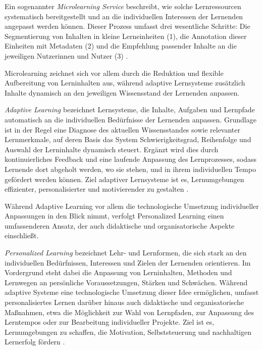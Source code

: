 Ein sogenannter \textit{Microlearning Service} beschreibt, wie solche Lernressourcen systematisch bereitgestellt und an die individuellen Interessen der Lernenden angepasst werden können. Dieser Prozess umfasst drei wesentliche Schritte: Die Segmentierung von Inhalten in kleine Lerneinheiten (1), die Annotation dieser Einheiten mit Metadaten (2) und die Empfehlung passender Inhalte an die jeweiligen Nutzerinnen und Nutzer (3) \parencite[S.~152--154]{lin_survey_2019}.

Microlearning zeichnet sich vor allem durch die Reduktion und flexible Aufbereitung von Lerninhalten aus, während adaptive Lernsysteme zusätzlich Inhalte dynamisch an den jeweiligen Wissensstand der Lernenden anpassen.

\textit{Adaptive Learning} bezeichnet Lernsysteme, die Inhalte, Aufgaben und Lernpfade automatisch an die individuellen Bedürfnisse der Lernenden anpassen. Grundlage ist in der Regel eine Diagnose des aktuellen Wissensstandes sowie relevanter Lernmerkmale, auf deren Basis das System Schwierigkeitsgrad, Reihenfolge und Auswahl der Lerninhalte dynamisch steuert. Ergänzt wird dies durch kontinuierliches Feedback und eine laufende Anpassung des Lernprozesses, sodass Lernende dort abgeholt werden, wo sie stehen, und in ihrem individuellen Tempo gefördert werden können. Ziel adaptiver Lernsysteme ist es, Lernumgebungen effizienter, personalisierter und motivierender zu gestalten \parencite[S.~448]{zhao_research_2019}.

Während Adaptive Learning vor allem die technologische Umsetzung individueller Anpassungen in den Blick nimmt, verfolgt Personalized Learning einen umfassenderen Ansatz, der auch didaktische und organisatorische Aspekte einschließt.

\textit{Personalized Learning} bezeichnet Lehr- und Lernformen, die sich stark an den individuellen Bedürfnissen, Interessen und Zielen der Lernenden orientieren. Im Vordergrund steht dabei die Anpassung von Lerninhalten, Methoden und Lernwegen an persönliche Voraussetzungen, Stärken und Schwächen. Während adaptive Systeme eine technologische Umsetzung dieser Idee ermöglichen, umfasst personalisiertes Lernen darüber hinaus auch didaktische und organisatorische Maßnahmen, etwa die Möglichkeit zur Wahl von Lernpfaden, zur Anpassung des Lerntempos oder zur Bearbeitung individueller Projekte. Ziel ist es, Lernumgebungen zu schaffen, die Motivation, Selbststeuerung und nachhaltigen Lernerfolg fördern \parencites[S.~6ff]{pane_informing_2017}[S.~2f]{gunawardena_personalized_2024}[S.~236--239]{walkington_appraising_2020}.

